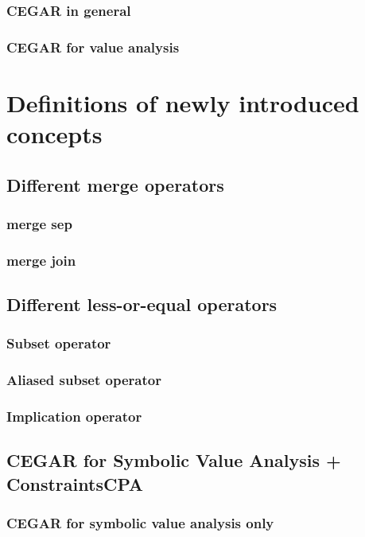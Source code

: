 \documentclass[a4paper,11pt]{article}
\begin{document}
\subsubsection{CEGAR in general}
\subsubsection{CEGAR for value analysis}

\section{Definitions of newly introduced concepts}

\subsection{Different merge operators}
\subsubsection{merge sep}
\subsubsection{merge join}

\subsection{Different less-or-equal operators}
\subsubsection{Subset operator}
\subsubsection{Aliased subset operator}
\subsubsection{Implication operator}

\subsection{CEGAR for Symbolic Value Analysis + ConstraintsCPA}
\subsubsection{CEGAR for symbolic value analysis only}
\end{document}
